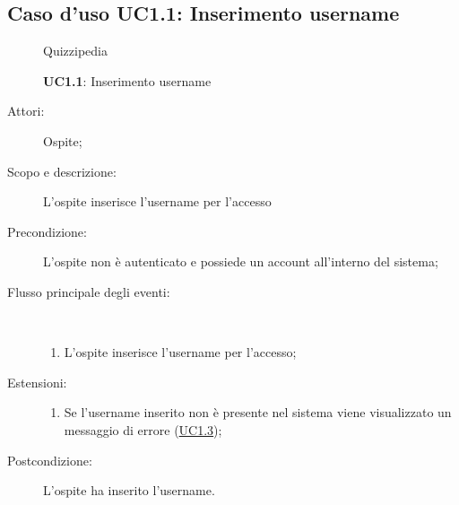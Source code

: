 \subsection{Caso d'uso UC1.1: Inserimento username}
	\begin{figure}[H]
		\centering
		\begin{resizedtikzpicture}{\textwidth}
		\begin{umlsystem}[x=0, fill=lightgray!20]{Quizzipedia}
		\end{umlsystem}
		\end{resizedtikzpicture}
		\caption{\textbf{UC1.1}: Inserimento username}
		\label{UC1.1}
	\end{figure}
\begin{description}
\item[Attori:] Ospite;
\item[Scopo e descrizione:] L'ospite inserisce l'username per l'accesso
      \item[Precondizione:] L'ospite non è autenticato e possiede un account all'interno del sistema;

        \item[Flusso principale degli eventi:] \ 
 \begin{enumerate}
          \item L'ospite inserisce l'username per l'accesso;

      \end{enumerate}
    \item[Estensioni:]
      \begin{enumerate}
          \item Se l'username inserito non è presente nel sistema viene visualizzato un messaggio di errore (\hyperlink{UC1.3}{UC1.3});

      \end{enumerate}
    \item[Postcondizione:] L'ospite ha inserito l'username.
  \end{description}
\hypertarget{UC1.2}{}
